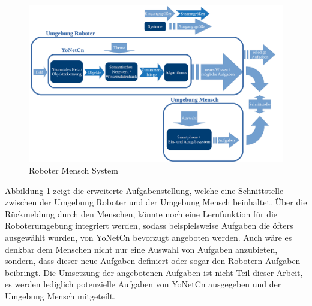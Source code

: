 \begin{figure}[h]
	
	\begin{center}
		
		\includegraphics[width=16cm]{images/Masteridee_3.png}
		
		\caption{Roboter Mensch System}
		
		\label{Roboter_Mensch_System}
		
	\end{center}
	
	
\end{figure}


Abbildung \ref{Roboter_Mensch_System} zeigt die erweiterte Aufgabenstellung, welche eine Schnittstelle zwischen der Umgebung Roboter und der Umgebung Mensch beinhaltet. 
Über die Rückmeldung durch den Menschen, könnte noch eine Lernfunktion für die Roboterumgebung integriert werden, sodass beispielsweise Aufgaben die öfters ausgewählt wurden, von YoNetCn bevorzugt angeboten werden. Auch wäre es denkbar dem Menschen nicht nur eine Auswahl von Aufgaben anzubieten, sondern, dass dieser neue Aufgaben definiert oder sogar den Robotern Aufgaben beibringt. 
Die Umsetzung der angebotenen Aufgaben ist nicht Teil dieser Arbeit, es werden lediglich potenzielle Aufgaben von YoNetCn ausgegeben und der Umgebung Mensch mitgeteilt. 









